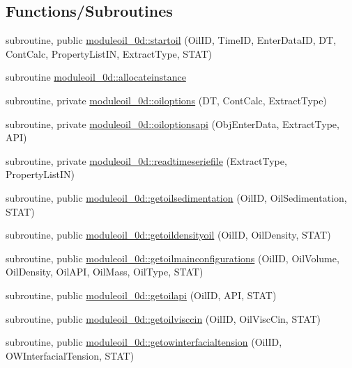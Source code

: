 \subsection*{Functions/\+Subroutines}
\begin{DoxyCompactItemize}
\item 
subroutine, public \mbox{\hyperlink{namespacemoduleoil__0d_a7a8a1d1d956230a40fa8f10e664138e3}{moduleoil\+\_\+0d\+::startoil}} (Oil\+ID, Time\+ID, Enter\+Data\+ID, DT, Cont\+Calc, Property\+List\+IN, Extract\+Type, S\+T\+AT)
\item 
subroutine \mbox{\hyperlink{namespacemoduleoil__0d_a90135088740373e7de26e5316c979963}{moduleoil\+\_\+0d\+::allocateinstance}}
\item 
subroutine, private \mbox{\hyperlink{namespacemoduleoil__0d_ae91c560ecac70b4b9f3ba4ca7f14edbe}{moduleoil\+\_\+0d\+::oiloptions}} (DT, Cont\+Calc, Extract\+Type)
\item 
subroutine, private \mbox{\hyperlink{namespacemoduleoil__0d_aee1786140ad8f5a32f57df0b719d830b}{moduleoil\+\_\+0d\+::oiloptionsapi}} (Obj\+Enter\+Data, Extract\+Type, A\+PI)
\item 
subroutine, private \mbox{\hyperlink{namespacemoduleoil__0d_a3c2fbab1e96896178c05bcf889f853fc}{moduleoil\+\_\+0d\+::readtimeseriefile}} (Extract\+Type, Property\+List\+IN)
\item 
subroutine, public \mbox{\hyperlink{namespacemoduleoil__0d_a76e417f6fa89172bc195c9dca9d10dc7}{moduleoil\+\_\+0d\+::getoilsedimentation}} (Oil\+ID, Oil\+Sedimentation, S\+T\+AT)
\item 
subroutine, public \mbox{\hyperlink{namespacemoduleoil__0d_ab2e737cc90063238a3eedf443bd6b593}{moduleoil\+\_\+0d\+::getoildensityoil}} (Oil\+ID, Oil\+Density, S\+T\+AT)
\item 
subroutine, public \mbox{\hyperlink{namespacemoduleoil__0d_af1cdc5385033828e9fd0e86082d2c7f3}{moduleoil\+\_\+0d\+::getoilmainconfigurations}} (Oil\+ID, Oil\+Volume, Oil\+Density, Oil\+A\+PI, Oil\+Mass, Oil\+Type, S\+T\+AT)
\item 
subroutine, public \mbox{\hyperlink{namespacemoduleoil__0d_a69465813f24b303b64f2b23399c114da}{moduleoil\+\_\+0d\+::getoilapi}} (Oil\+ID, A\+PI, S\+T\+AT)
\item 
subroutine, public \mbox{\hyperlink{namespacemoduleoil__0d_a6049ae3704910b8c95b19beb79419be6}{moduleoil\+\_\+0d\+::getoilvisccin}} (Oil\+ID, Oil\+Visc\+Cin, S\+T\+AT)
\item 
subroutine, public \mbox{\hyperlink{namespacemoduleoil__0d_a07a5b422ec6e58c220beb82777c68f30}{moduleoil\+\_\+0d\+::getowinterfacialtension}} (Oil\+ID, O\+W\+Interfacial\+Tension, S\+T\+AT)

\end{DoxyCompactItemize}
